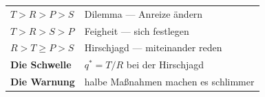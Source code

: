 \begin{merksatz}
\begin{center}
\renewcommand{\arraystretch}{1.5}
\begin{tabular}{@{}P{3.0cm}P{5.6cm}@{}}
\toprule
\textbf{$T>R>P>S$} & Dilemma --- Anreize ändern\\
\textbf{$T>R>S>P$} & Feigheit --- sich festlegen\\
\textbf{$R>T\ge P>S$} & Hirschjagd --- miteinander reden\\
\textbf{Die Schwelle} & $q^{*} = T/R$ bei der Hirschjagd\\
\textbf{Die Warnung} & halbe Maßnahmen machen es schlimmer\\
\bottomrule
\end{tabular}
\end{center}

\begin{center}
\begin{minipage}{0.88\textwidth}
\end{minipage}
\end{center}
\end{merksatz}
